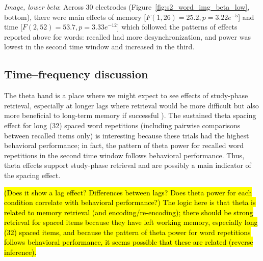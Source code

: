 \textit{Image, lower beta}: Across 30 electrodes (Figure~\ref{fig:s2_word_img_beta_low}, bottom), there were main effects of memory [$F(1,26)=25.2, p=3.22e^{-5}$] and time [$F(2,52)=53.7, p=3.33e^{-12}$] which followed the patterns of effects reported above for words: recalled had more desynchronization, and power was lowest in the second time window and increased in the third.

\subsection{Time--frequency discussion}


The theta band is a place where we might expect to see effects of study-phase retrieval,
especially at longer lags where retrieval would be more difficult but also more beneficial to long-term memory if successful
\cite{DelaEtal2010,PavlAnde2005}).
The sustained theta spacing effect for long (32) spaced word repetitions (including pairwise comparisons between recalled items only) is interesting because these trials had the highest behavioral performance; in fact, the pattern of theta power for recalled word repetitions in the second time window follows behavioral performance.  Thus, theta effects support study-phase retrieval and are possibly a main indicator of the spacing effect.

\hl{(Does it show a lag effect? Differences between lags?  Does theta power for each condition correlate with behavioral performance?)  The logic here is that theta is related to memory retrieval (and encoding/re-encoding); there should be strong retrieval for spaced items because they have left working memory, especially long (32) spaced items, and because the pattern of theta power for word repetitions follows behavioral performance, it seems possible that these are related (reverse inference).}



